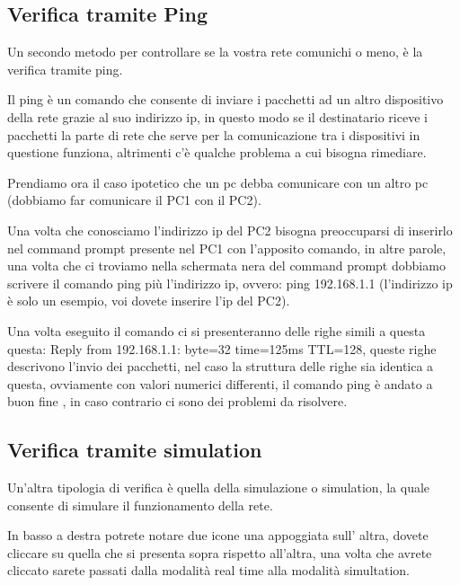 \subsection{Verifica tramite Ping}
Un secondo metodo per controllare se la vostra rete comunichi o meno, è la verifica tramite ping.

Il ping è un comando che consente di inviare i pacchetti ad un altro dispositivo della rete grazie al suo indirizzo ip, in questo modo se il destinatario riceve i pacchetti la parte di rete che serve per la comunicazione tra i dispositivi in questione funziona, altrimenti c'è qualche problema a cui bisogna rimediare.

Prendiamo ora il caso ipotetico che un pc debba comunicare con un altro pc (dobbiamo far comunicare il PC1 con il PC2).

Una volta che conosciamo l'indirizzo ip del PC2 bisogna preoccuparsi di inserirlo nel command prompt presente nel PC1 con l’apposito comando, in altre parole, una volta che ci troviamo nella schermata nera del command prompt dobbiamo scrivere il comando ping più l’indirizzo ip, ovvero: ping 192.168.1.1 (l'indirizzo ip è solo un esempio, voi dovete inserire l'ip del PC2).

Una volta eseguito il comando ci si presenteranno delle righe simili a questa questa: Reply from 192.168.1.1: byte=32 time=125ms TTL=128, queste righe descrivono l'invio dei pacchetti, nel caso la struttura delle righe sia identica a questa, ovviamente con valori numerici differenti, il comando ping è andato a buon fine , in caso contrario ci sono dei problemi da risolvere.

\subsection{Verifica tramite simulation}
Un'altra tipologia di verifica è quella della simulazione o simulation, la quale consente di simulare il funzionamento della rete.

In basso a destra potrete notare due icone una appoggiata sull' altra, dovete cliccare su quella che si presenta sopra rispetto all'altra, una volta che avrete cliccato sarete passati dalla modalità real time alla modalità simultation.


